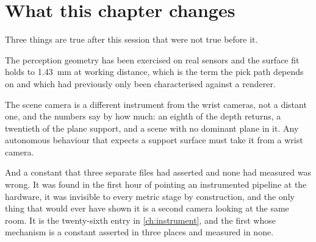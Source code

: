 \section{What this chapter changes}

Three things are true after this session that were not true before it.

The perception geometry has been exercised on real sensors and the surface fit
holds to \SI{1.43}{\milli\metre} at working distance, which is the term the
pick path depends on and which had previously only been characterised against
a renderer.

The scene camera is a different instrument from the wrist cameras, not a
distant one, and the numbers say by how much: an eighth of the depth returns,
a twentieth of the plane support, and a scene with no dominant plane in it.
Any autonomous behaviour that expects a support surface must take it from a
wrist camera.

And a constant that three separate files had asserted and none had measured
was wrong. It was found in the first hour of pointing an instrumented pipeline
at the hardware, it was invisible to every metric stage by construction, and
the only thing that would ever have shown it is a second camera looking at the
same room. It is the twenty-sixth entry in \cref{ch:instrument}, and the first
whose mechanism is a constant asserted in three places and measured in none.
